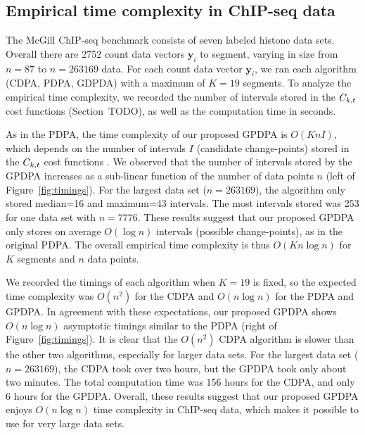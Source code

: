 \documentclass{article}
\begin{document}

\subsection{Empirical time complexity in ChIP-seq data}
\label{sec:results_time}

The McGill ChIP-seq benchmark consists of seven labeled histone data
sets.
Overall there are 2752 count data vectors $\mathbf y_i$ to segment,
varying in size from $n=87$ to $n=263169$ data. For each count data
vector $\mathbf y_i$, we ran each algorithm (CDPA, PDPA, GDPDA) with a
maximum of $K=19$ segments. To analyze the empirical time complexity,
we recorded the number of intervals stored in the $C_{k,t}$ cost
functions (Section~TODO), as well as the computation time in seconds.

As in the PDPA, the time complexity of our proposed GPDPA is
$O(K n I)$, which depends on the number of intervals $I$ (candidate
change-points) stored in the $C_{k,t}$ cost functions
\citep{pruned-dp-new}. We observed that the number of intervals stored
by the GPDPA increases as a sub-linear function of the number of data
points $n$ (left of Figure~\ref{fig:timings}). For the largest data
set ($n=263169$), the algorithm only stored median=16 and maximum=43
intervals. The most intervals stored was 253 for one data set with
$n=7776$. These results suggest that our proposed GPDPA only stores on
average $O(\log n)$ intervals (possible change-points), as in the
original PDPA. The overall empirical time complexity is thus
$O(K n \log n)$ for $K$ segments and $n$ data points.

We recorded the timings of each algorithm when $K=19$ is fixed, so the
expected time complexity was $O(n^2)$ for the CDPA and $O(n \log n)$
for the PDPA and GPDPA. In agreement with these expectations, our
proposed GPDPA shows $O(n\log n)$ asymptotic timings similar to the
PDPA (right of Figure~\ref{fig:timings}). It is clear that the $O(n^2)$
CDPA algorithm is slower than the other two algorithms,
especially for larger data sets. For the largest data set
($n=263169$), the CDPA took over two hours, but the GPDPA took only
about two minutes. The total computation time was 156 hours for the
CDPA, and only 6 hours for the GPDPA. Overall, these results suggest
that our proposed GPDPA enjoys $O(n\log n)$ time complexity in
ChIP-seq data, which makes it possible to use for very large data
sets.
\end{document}
